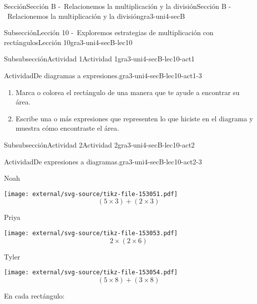 \documentclass[twoside,14pt,]{extarticle}
\begin{document}
\begin{sectionptx}{Sección}{Sección B -~Relacionemos la multiplicación y la división}{}{Sección B -~Relacionemos la multiplicación y la división}{}{}{gra3-uni4-secB}
\begin{subsectionptx}{Subsección}{Lección 10 -~Exploremos estrategias de multiplicación con rectángulos}{}{Lección 10}{}{}{gra3-uni4-secB-lec10}
\begin{subsubsectionptx}{Subsubsección}{Actividad 1}{}{Actividad 1}{}{}{gra3-uni4-secB-lec10-act1}
\begin{activity}{Actividad}{De diagramas a expresiones.}{gra3-uni4-secB-lec10-act1-3}
\begin{enumerate}
\begin{sidebyside}{2}{0}{0}{0}
\begin{sbspanel}{0.5}
\end{sbspanel}%
\end{sidebyside}%
%
\begin{enumerate}
\item{}Marca o colorea el rectángulo de una manera que te ayude a encontrar su área.%
\item{}Escribe una o más expresiones que representen lo que hiciste en el diagrama y muestra cómo encontraste el área.%
\end{enumerate}
%
\end{enumerate}
\end{activity}%
\end{subsubsectionptx}
%
%
\typeout{************************************************}
\typeout{************************************************}
%
\begin{subsubsectionptx}{Subsubsección}{Actividad 2}{}{Actividad 2}{}{}{gra3-uni4-secB-lec10-act2}
\begin{activity}{Actividad}{De expresiones a diagramas.}{gra3-uni4-secB-lec10-act2-3}%
\begin{sidebyside}{3}{0.0166666666666667}{0.0166666666666667}{0.0333333333333333}%
\begin{sbspanel}{0.3}%
Noah%
\par
\texttt{[image: external/svg-source/tikz-file-153051.pdf]}
%
\begin{equation*}
(5\times 3)+(2 \times 3)
\end{equation*}
%
\end{sbspanel}%
\begin{sbspanel}{0.3}%
Priya%
\par
\texttt{[image: external/svg-source/tikz-file-153053.pdf]}
%
\begin{equation*}
2 \times (2 \times 6)
\end{equation*}
%
\end{sbspanel}%
\begin{sbspanel}{0.3}%
Tyler%
\par
\texttt{[image: external/svg-source/tikz-file-153054.pdf]}
%
\begin{equation*}
(5 \times 8) + (3 \times 8)
\end{equation*}
%
\end{sbspanel}%
\end{sidebyside}%
\par
En cada rectángulo:%

\end{activity}
\end{subsubsectionptx}
\end{subsectionptx}
\end{sectionptx}
\end{document}
